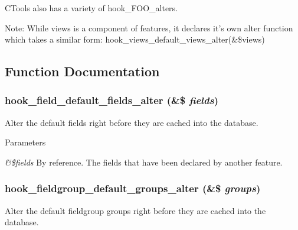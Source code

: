 CTools also has a variety of hook\_\-FOO\_\-alters.

Note: While views is a component of features, it declares it's own alter function which takes a similar form: hook\_\-views\_\-default\_\-views\_\-alter(\&\$views) 

\subsection{Function Documentation}
\hypertarget{group__features__component__alter__hooks_ga3016751cc0cbd57d187bc995601b37f9}{
\subsubsection[{hook\_\-field\_\-default\_\-fields\_\-alter}]{\setlength{\rightskip}{0pt plus 5cm}hook\_\-field\_\-default\_\-fields\_\-alter (\&\$ {\em fields})}}
\label{group__features__component__alter__hooks_ga3016751cc0cbd57d187bc995601b37f9}
Alter the default fields right before they are cached into the database.


\begin{DoxyParams}{Parameters}
\item[{\em \&\$fields}]By reference. The fields that have been declared by another feature. \end{DoxyParams}
\hypertarget{group__features__component__alter__hooks_ga627a5cda9de3fa0baa4091fbd798aa9a}{
\subsubsection[{hook\_\-fieldgroup\_\-default\_\-groups\_\-alter}]{\setlength{\rightskip}{0pt plus 5cm}hook\_\-fieldgroup\_\-default\_\-groups\_\-alter (\&\$ {\em groups})}}
\label{group__features__component__alter__hooks_ga627a5cda9de3fa0baa4091fbd798aa9a}
Alter the default fieldgroup groups right before they are cached into the database.


